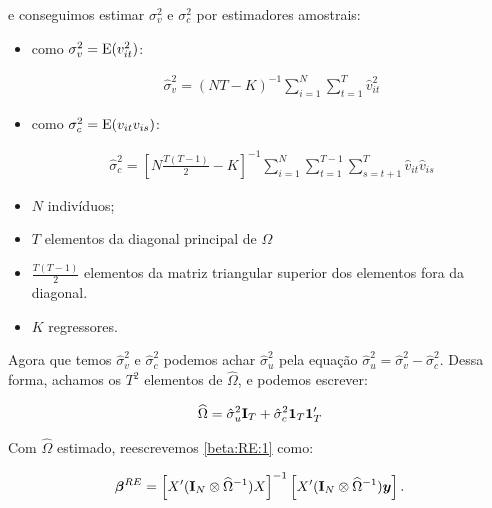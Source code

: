 \documentclass[11pt, oneside, a4paper, article]{article}
\numberwithin{equation}{section}
\begin{document}
\begin{description}
\noindent
e conseguimos estimar $\sigma_{v}^{2}$ e $\sigma_{c}^{2}$ por estimadores amostrais:

\begin{itemize}\itemsep0pt
\item 
como $\sigma_{v}^{2} = \text{E}(v_{it}^{2})$:

\vspace{-1.5 em}
\begin{align*}
\hat{\sigma}_{v}^{2} =
(NT - K)^{-1} 
\sum_{i=1}^{N}
\sum_{t=1}^{T}
\hat{v}_{it}^2
\end{align*}
\vspace{-1.5 em}

\item 
como $\sigma_{c}^{2} = \text{E}(v_{it} v_{is})$:

\vspace{-1.5 em}
\begin{align*}
\hat{\sigma}_{c}^{2} =
\left[ N \frac{T ( T-1 )}{2} - K  \right]^{-1}
\sum_{i=1}^{N}
\sum_{t=1}^{T-1}
\sum_{s=t+1}^{T}
\hat{v}_{it} \hat{v}_{is}
\end{align*}
\vspace{-1.5 em}

\item $N$ indivíduos;

\item $T$ elementos da diagonal principal de $\Omega$

\item $\frac{T ( T - 1)}{2}$ elementos da matriz triangular superior dos elementos fora da diagonal.

\item $K$ regressores.
\end{itemize}

Agora que temos $\hat{\sigma}^2_{v}$ e $\hat{\sigma}^2_{c}$ podemos achar $\hat{\sigma}^{2}_{u}$ pela equação $\boxed{\hat{\sigma}_{u}^{2} = \hat{\sigma}_{v}^{2} - \hat{\sigma}_{c}^{2}}$.
Dessa forma, achamos os $T^2$ elementos de $\widehat{\Omega}$, e podemos escrever:

\vspace{-1 em}
\begin{align*}
\widehat{\Omega}
= 
\hat{\sigma}^{2}_{u} \mathbf{I}_{T} + \hat{\sigma}_{c}^{2} \boldsymbol{1}_{T} \boldsymbol{1}_{T}'
\end{align*}

Com $\widehat{\Omega}$ estimado, reescrevemos \eqref{beta:RE:1} como:

\vspace{-1 em}
\begin{align} \label{beta:RE:2}
\boldsymbol{\beta}^{RE} = 
\left[ X' (\mathbf{I}_{N} \otimes \widehat{\Omega}^{-1}) X \right]^{-1}
\left[ X' (\mathbf{I}_{N} \otimes \widehat{\Omega}^{-1}) \boldsymbol{y} \right].
\end{align}



\end{description}
\end{document}
